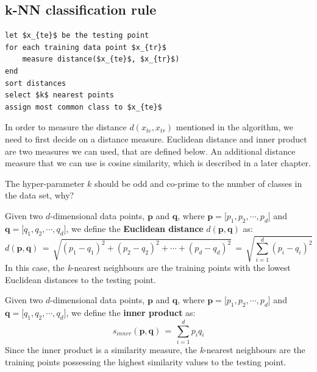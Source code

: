 \documentclass[11pt,fleqn]{book} %
\begin{document}
\subsection{k-NN classification rule}
\begin{lstlisting}[mathescape]
let $x_{te}$ be the testing point
for each training data point $x_{tr}$
    measure distance($x_{te}$, $x_{tr}$)
end
sort distances
select $k$ nearest points
assign most common class to $x_{te}$	
\end{lstlisting}

\noindent
In order to measure the distance $d(x_{te}, x_{tr})$ mentioned in the algorithm, we need to first decide on a distance measure. Euclidean distance and inner product are two measures we can used, that are defined below. An additional distance measure that we can use is cosine similarity, which is described in a later chapter.\\

\begin{exercise}
The hyper-parameter $k$ should be odd and co-prime to the number of classes in the data set, why?
\end{exercise}

\begin{definition}
Given two $d$-dimensional data points, $\mathbf{p}$ and $\mathbf{q}$, where $\mathbf{p}= \big[p_1, p_2, \cdots, p_d\big]$ and $\mathbf{q} = \big[q_1, q_2, \cdots, q_d\big]$, we define the \textbf{Euclidean distance} $d(\mathbf{p},\mathbf{q})$ as:
\begin{equation*}
	d(\mathbf{p},\mathbf{q}) \, = \, \sqrt{(p_1 - q_1)^2 + (p_2 - q_2)^2 + \cdots + (p_d - q_d)^2} \, = \, \sqrt{\sum^d_{i=1}(p_i - q_i)^2}
\end{equation*}
In this case, the \textit{k}-nearest neighbours are the training points with the lowest Euclidean distances to the testing point.
\end{definition}

\begin{definition}
Given two $d$-dimensional data points, $\mathbf{p}$ and $\mathbf{q}$, where $\mathbf{p}= \big[p_1, p_2, \cdots, p_d\big]$ and $\mathbf{q} = \big[q_1, q_2, \cdots, q_d\big]$, we define the \textbf{inner product} as:
\begin{equation*}
	s_{inner}(\mathbf{p},\mathbf{q}) \, = \, \sum^d_{i=1}p_iq_i
\end{equation*}
Since the inner product is a similarity measure, the \textit{k}-nearest neighbours are the training points possessing the highest similarity values to the testing point.
\end{definition}
\end{document}
